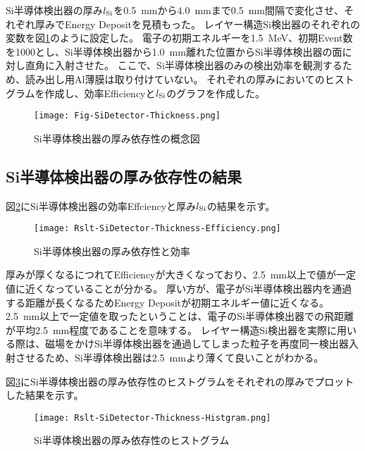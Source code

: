 \documentclass[a4paper,10pt]{jreport}
\begin{document}
Si半導体検出器の厚み$l_{\rm{Si}}$を\SI{0.5}{mm}から\SI{4.0}{mm}まで\SI{0.5}{mm}間隔で変化させ、それぞれ厚みでEnergy Depositを見積もった。
レイヤー構造Si検出器のそれぞれの変数を図\ref{Fig-SiDetector-Thickness}のように設定した。
電子の初期エネルギーを\SI{1.5}{MeV}、初期Event数を1000とし、Si半導体検出器から\SI{1.0}{mm}離れた位置からSi半導体検出器の面に対し直角に入射させた。
ここで、Si半導体検出器のみの検出効率を観測するため、読み出し用Al薄膜は取り付けていない。
それぞれの厚みにおいてのヒストグラムを作成し、効率Efficiencyと$l_{\rm{Si}}$のグラフを作成した。

\begin{figure}[H]
	\center
	\texttt{[image: Fig-SiDetector-Thickness.png]}
	\caption{Si半導体検出器の厚み依存性の概念図} \label{Fig-SiDetector-Thickness}
\end{figure}




\subsection{Si半導体検出器の厚み依存性の結果}

図\ref{Rslt-SiDetector-Thickness-Efficiency}にSi半導体検出器の効率Effciencyと厚み$l_{\rm{Si}}$の結果を示す。

\begin{figure}[H]
	\center
	\texttt{[image: Rslt-SiDetector-Thickness-Efficiency.png]}
	\caption{Si半導体検出器の厚み依存性と効率} \label{Rslt-SiDetector-Thickness-Efficiency}
\end{figure}

厚みが厚くなるにつれてEfficiencyが大きくなっており、\SI{2.5}{mm}以上で値が一定値に近くなっていることが分かる。
厚い方が、電子がSi半導体検出器内を通過する距離が長くなるためEnergy Depositが初期エネルギー値に近くなる。
\SI{2.5}{mm}以上で一定値を取ったということは、電子のSi半導体検出器での飛距離が平均\SI{2.5}{mm}程度であることを意味する。
レイヤー構造Si検出器を実際に用いる際は、磁場をかけSi半導体検出器を通過してしまった粒子を再度同一検出器入射させるため、Si半導体検出器は\SI{2.5}{mm}より薄くて良いことがわかる。

図\ref{Rslt-SiDetector-Thickness-Histgram}にSi半導体検出器の厚み依存性のヒストグラムをそれぞれの厚みでプロットした結果を示す。

\begin{figure}[H]
	\center
	\texttt{[image: Rslt-SiDetector-Thickness-Histgram.png]}
	\caption{Si半導体検出器の厚み依存性のヒストグラム} \label{Rslt-SiDetector-Thickness-Histgram}
\end{figure}
\end{document}
